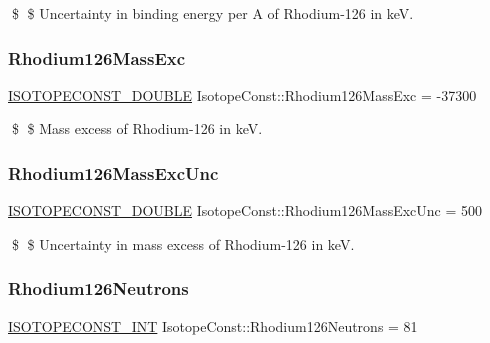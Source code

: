 \$ \$ Uncertainty in binding energy per A of Rhodium-\/126 in keV. \mbox{\label{group___isotope_const-_rhodium-_rh126_ga1681e259f8b1eb24f65db3719f1f17ed}} 
\subsubsection{\texorpdfstring{Rhodium126\+Mass\+Exc}{Rhodium126MassExc}}
{\footnotesize\ttfamily \mbox{\hyperlink{group___isotope_const-_macros_ga8f45a7272ce02c0b4c65c44636ed719a}{I\+S\+O\+T\+O\+P\+E\+C\+O\+N\+S\+T\+\_\+\+D\+O\+U\+B\+LE}} Isotope\+Const\+::\+Rhodium126\+Mass\+Exc = -\/37300}

\$ \$ Mass excess of Rhodium-\/126 in keV. \mbox{\label{group___isotope_const-_rhodium-_rh126_ga5ada64267936c7e32ba80e092edcf055}} 
\subsubsection{\texorpdfstring{Rhodium126\+Mass\+Exc\+Unc}{Rhodium126MassExcUnc}}
{\footnotesize\ttfamily \mbox{\hyperlink{group___isotope_const-_macros_ga8f45a7272ce02c0b4c65c44636ed719a}{I\+S\+O\+T\+O\+P\+E\+C\+O\+N\+S\+T\+\_\+\+D\+O\+U\+B\+LE}} Isotope\+Const\+::\+Rhodium126\+Mass\+Exc\+Unc = 500}

\$ \$ Uncertainty in mass excess of Rhodium-\/126 in keV. \mbox{\label{group___isotope_const-_rhodium-_rh126_ga7178b375525288022ce5332b96385f9a}} 
\subsubsection{\texorpdfstring{Rhodium126\+Neutrons}{Rhodium126Neutrons}}
{\footnotesize\ttfamily \mbox{\hyperlink{group___isotope_const-_macros_ga5f18360b3e99483a35c32d789e62621c}{I\+S\+O\+T\+O\+P\+E\+C\+O\+N\+S\+T\+\_\+\+I\+NT}} Isotope\+Const\+::\+Rhodium126\+Neutrons = 81}

